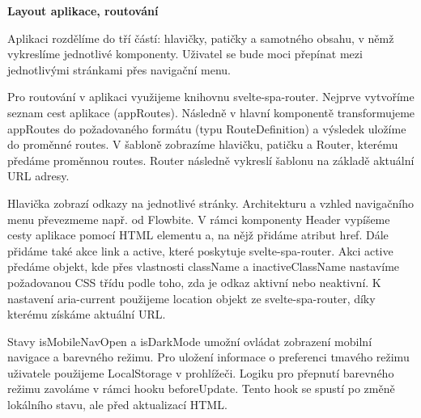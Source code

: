 
\begin{flushleft}
  \textbf{Layout aplikace, routování}
\end{flushleft}

Aplikaci rozdělíme do tří částí: hlavičky, patičky a samotného obsahu, v němž vykreslíme jednotlivé komponenty. Uživatel se bude moci přepínat mezi jednotlivými stránkami přes navigační menu. 

Pro routování v aplikaci využijeme knihovnu svelte-spa-router. Nejprve vytvoříme seznam cest aplikace (appRoutes). 
Následně v hlavní komponentě transformujeme appRoutes do požadovaného formátu (typu RouteDefinition) a výsledek uložíme do proměnné routes. 
V šabloně zobrazíme hlavičku, patičku a Router, kterému předáme proměnnou routes. Router následně vykreslí šablonu na základě aktuální URL adresy.

Hlavička zobrazí odkazy na jednotlivé stránky. Architekturu a vzhled navigačního menu převezmeme např. od Flowbite. 
V rámci komponenty Header vypíšeme cesty aplikace pomocí HTML elementu a, na nějž přidáme atribut href. Dále přidáme také akce link a active, které poskytuje svelte-spa-router. 
Akci active předáme objekt, kde přes vlastnosti className a inactiveClassName nastavíme požadovanou CSS třídu podle toho, zda je odkaz aktivní nebo neaktivní. 
K nastavení aria-current použijeme location objekt ze svelte-spa-router, díky kterému získáme aktuální URL.

Stavy isMobileNavOpen a isDarkMode umožní ovládat zobrazení mobilní navigace a barevného režimu. 
Pro uložení informace o preferenci tmavého režimu uživatele použijeme LocalStorage v prohlížeči. Logiku pro přepnutí barevného režimu zavoláme v rámci hooku beforeUpdate. 
Tento hook se spustí po změně lokálního stavu, ale před aktualizací HTML.